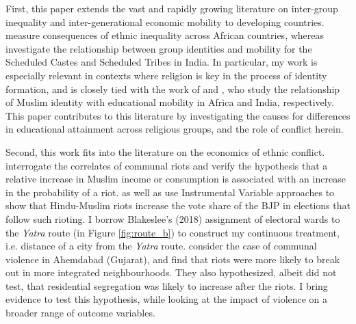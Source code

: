 \documentclass{article}
\begin{document}
First, this paper extends the vast and rapidly growing literature on inter-group inequality and inter-generational economic mobility \citep{chetty2014land} to developing countries. \cite{alesina2016ethnic} measure consequences of ethnic inequality across African countries, whereas \cite{sethi2010group} investigate the relationship between group identities and mobility for the Scheduled Castes and Scheduled Tribes in India. In particular, my work is especially relevant in contexts where religion is key in the process of identity formation, and is closely tied with the work of \cite{alesina2020religion} and \cite{asher.2018}, who study the relationship of Muslim identity with educational mobility in Africa and India, respectively. This paper contributes to this literature by investigating the causes for differences in educational attainment across religious groups, and the role of conflict herein.  

Second, this work fits into the literature on the economics of ethnic conflict. \cite{mitra.2014} interrogate the correlates of communal riots and verify the hypothesis that a relative increase in Muslim income or consumption is associated with an increase in the probability of a riot. \cite{iyer2015religious} as well as \cite{blakeslee.2018} use Instrumental Variable approaches to show that Hindu-Muslim riots increase the vote share of the BJP in elections that follow such rioting. I borrow Blakeslee's (2018) assignment of electoral wards to the \emph{Yatra} route (in Figure \ref{fig:route_b}) to construct my continuous treatment, i.e. distance of a city from the \textit{Yatra} route. \cite{field2008segregation} consider the case of communal violence in Ahemdabad (Gujarat), and find that riots were more likely to break out in more integrated neighbourhoods. They also hypothesized, albeit did not test, that residential segregation was likely to increase after the riots. I bring evidence to test this hypothesis, while looking at the impact of violence on a broader range of outcome variables.  
\end{document}
